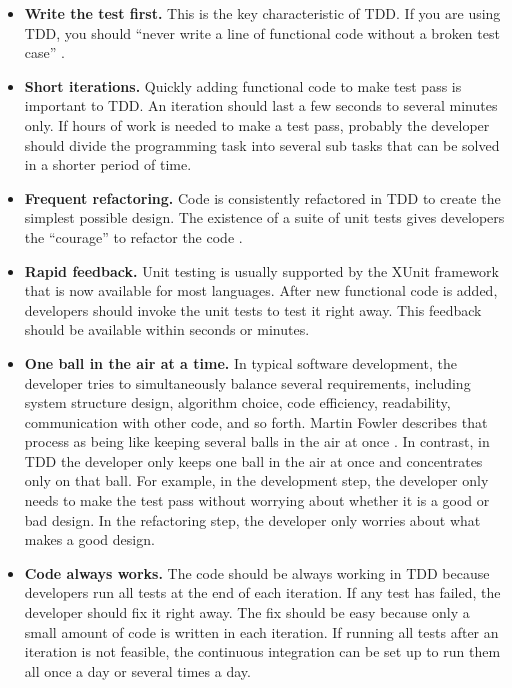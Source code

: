 \documentclass[smallextended]{svjour3}     %
\begin{document}
\begin{itemize}
\item {\bf Write the test first.}
This is the key characteristic of TDD. If you are using 
TDD, you should ``never write a line of functional 
code without a broken test case'' \cite{Beck:01}. 

\item {\bf Short iterations.}
Quickly adding functional code to make test pass is important
to TDD. An iteration should last a few seconds to 
several minutes only. If hours of work is needed to make a 
test pass, probably the developer should divide the programming 
task into several sub tasks that can be solved in a shorter
period of time. \cite{NeedReference}

\item {\bf Frequent refactoring.}
Code is consistently refactored in TDD to create the simplest
possible design. The existence of a suite of unit tests gives 
developers the ``courage'' to refactor the code \cite{Beck:03}. 

\item {\bf Rapid feedback.}
Unit testing is usually supported by the XUnit \cite{XUnit}
framework that is now available for most languages. 
After new functional code is added, developers should invoke
the unit tests to test it right away. This feedback should be available
within seconds or minutes. 

\item {\bf One ball in the air at a time.}
In typical software development, the developer tries to simultaneously 
balance several requirements, including system structure design, algorithm choice, 
code efficiency, readability, communication with other code, and so forth.
Martin Fowler describes that process as being like keeping 
several balls in the air at once \cite{Beck:03}.
In contrast, in TDD the developer only keeps one ball in the air at once and 
concentrates only on that ball. For example, in the development
step, the developer only needs to make the test pass 
without worrying about whether it is a good or bad design. In 
the refactoring step, the developer only worries about what 
makes a good design. 

\item {\bf Code always works.} 
The code should be always working in TDD because developers run 
all tests at the end of each iteration. If any test has failed, 
the developer should fix it right away. The fix should be easy because 
only a small amount of code is written in each iteration. If running 
all tests after an iteration is not feasible, the continuous 
integration can be set up to run them all once a day or several 
times a day. 
\end{itemize}
\end{document}
